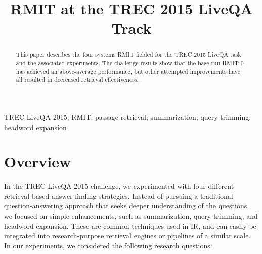 \documentclass[a4paper,10pt,conference,compsocconf,final]{IEEEtran}
\newcommand{\opstyle}[1]{\mbox{\textsc{#1}}}
\begin{document}

\title{RMIT at the TREC 2015 LiveQA Track}
\author{
}

\maketitle

\begin{abstract} This paper describes the four systems RMIT fielded
for the {\opstyle{TREC}} 2015 LiveQA task and the associated
experiments.
The challenge results show that the base run RMIT-0 has achieved an
above-average performance, but other attempted improvements have all
resulted in decreased retrieval effectiveness.
\end{abstract}

\begin{IEEEkeywords} 
  \opstyle{TREC} LiveQA 2015; RMIT; passage retrieval; summarization; query trimming; headword expansion
\end{IEEEkeywords}

\section{Overview}
\label{overview}
In the TREC LiveQA 2015 challenge, we experimented with four
different retrieval-based answer-finding strategies.
Instead of pursuing a traditional question-answering approach that
seeks deeper understanding of the questions, we focused on simple
enhancements, such as summarization, query trimming, and headword
expansion.
These are common techniques used in IR, and can easily be
integrated into research-purpose retrieval engines or pipelines of
a similar scale.
In our experiments, we considered the following research questions: 
\end{document}
